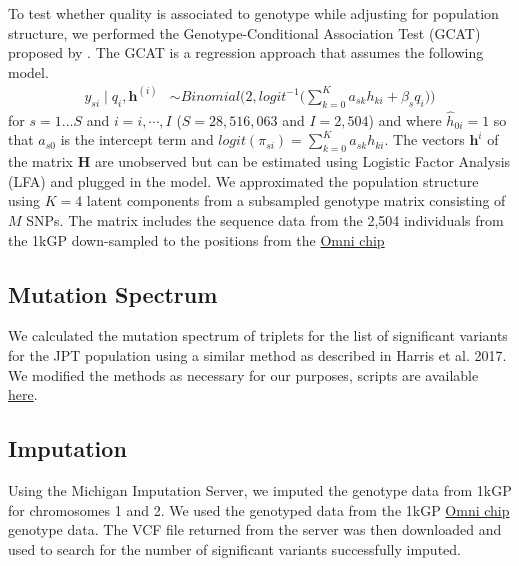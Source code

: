 \documentclass[custompaper]{MBE}%
\begin{document}
To test whether quality is associated to genotype while adjusting for population structure, we performed the Genotype-Conditional Association Test  (GCAT) proposed by \citep{song2015testing}.
The GCAT is a regression approach that assumes the following model.
\begin{align}\label{gcat}
 y_{si} \mid q_i, \boldsymbol{h}^{(i)} &\sim Binomial\bigg( 2, logit^{-1}\Big( \sum_{k=0}^{K} a_{sk} h_{ki} + \beta_s q_i\Big) \bigg)
\end{align} 
for $s=1\hdots S$ and $i=i,\cdots, I$  ($S = 28,516,063$ and $I = 2,504$) and where $\hat{h}_{0i}=1$ so that $a_{s0}$ is the intercept term and $logit(\pi_{si})=\sum_{k=0}^{K} a_{sk} h_{ki}$. 
The vectors $\boldsymbol{h}^{i}$ of the matrix $\mathbf{H}$ are unobserved but can be estimated using Logistic Factor Analysis (LFA) \citep{song2015testing} and plugged in the model. 
We approximated the population structure using $K=4$ latent components from a subsampled genotype matrix consisting of $M$ SNPs. 
The matrix includes the sequence data from the 2,504 individuals from the 1kGP down-sampled to the positions from the \href{ftp://ftp.1000genomes.ebi.ac.uk/vol1/ftp/release/20130502/supporting/hd_genotype_chip/ALL.chip.omni_broad_sanger_combined.20140818.snps.genotypes.vcf.gz}{Omni chip}

\subsection{Mutation Spectrum}
We calculated the mutation spectrum of triplets for the list of significant variants for the JPT population using a similar method as described in Harris et al. 2017. \citep{Harris2017a}
We modified the methods as necessary for our purposes, scripts are available \href{https://github.com/LukeAndersonTrocme/QualityPaper}{here}. 

\subsection{Imputation}
Using the Michigan Imputation Server, we imputed the genotype data from 1kGP for chromosomes 1 and 2.
We used the genotyped data from the 1kGP \href{ftp://ftp.1000genomes.ebi.ac.uk/vol1/ftp/release/20130502/supporting/hd_genotype_chip/ALL.chip.omni_broad_sanger_combined.20140818.snps.genotypes.vcf.gz}{Omni chip} genotype data.
The VCF file returned from the server was then downloaded and used to search for the number of significant variants successfully imputed. 
\end{document}
